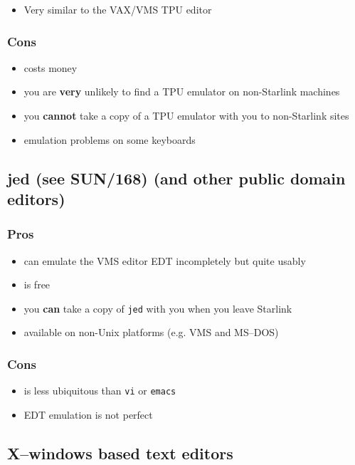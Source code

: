 \documentclass[twoside,11pt]{article}
\newcommand{\xref}[3]{#1}
\newcommand{\xlabel}[1]{}
\begin{document}
\begin{itemize}
\item Very similar to the VAX/VMS TPU editor
\end{itemize}

\subsubsection*{Cons}

\begin{itemize}
\item costs money
\item you are {\bf very} unlikely to find a TPU emulator on non-Starlink machines
\item you {\bf cannot} take a copy of a TPU emulator with you to non-Starlink sites
\item emulation problems on some keyboards
\end{itemize}

\subsection{\xlabel{jed}jed (see
\xref{SUN/168}{sun168}{}) (and other public domain editors)}

\subsubsection*{Pros}

\begin{itemize}
\item can emulate the VMS editor EDT incompletely but quite usably
\item is free
\item you {\bf can} take a copy of \verb|jed| with you when you leave Starlink
\item available on non-Unix platforms (e.g. VMS and MS--DOS)
\end{itemize}

\subsubsection*{Cons}
\begin{itemize}
\item is less ubiquitous than \verb|vi| or \verb|emacs|
\item EDT emulation is not perfect
\end{itemize}


\subsection{\xlabel{xwindows_based_text_editors}X--windows based text editors}
\end{document}
